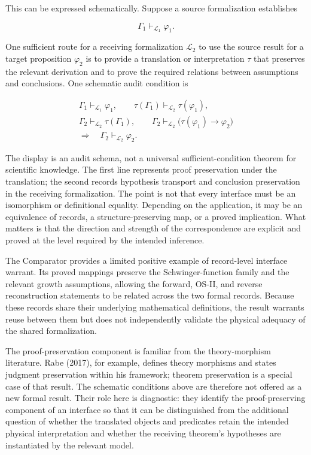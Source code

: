 \documentclass[pdflatex,sn-apa]{sn-jnl}
\begin{document}
This can be expressed schematically. Suppose a source formalization establishes

\[
\Gamma_1\vdash_{\mathcal L_1}\varphi_1.
\]

One sufficient route for a receiving formalization \(\mathcal L_2\) to use the source result for a target proposition \(\varphi_2\) is to provide a translation or interpretation \(\tau\) that preserves the relevant derivation and to prove the required relations between assumptions and conclusions. One schematic audit condition is

\[
\begin{gathered}
\Gamma_1\vdash_{\mathcal L_1}\varphi_1,\qquad
\tau(\Gamma_1)\vdash_{\mathcal L_2}\tau(\varphi_1),\\
\Gamma_2\vdash_{\mathcal L_2}\tau(\Gamma_1),\qquad
\Gamma_2\vdash_{\mathcal L_2}\bigl(\tau(\varphi_1)\rightarrow\varphi_2\bigr)
\\
\Longrightarrow\quad
\Gamma_2\vdash_{\mathcal L_2}\varphi_2.
\end{gathered}
\]

The display is an audit schema, not a universal sufficient-condition theorem for scientific knowledge. The first line represents proof preservation under the translation; the second records hypothesis transport and conclusion preservation in the receiving formalization. The point is not that every interface must be an isomorphism or definitional equality. Depending on the application, it may be an equivalence of records, a structure-preserving map, or a proved implication. What matters is that the direction and strength of the correspondence are explicit and proved at the level required by the intended inference.

The Comparator provides a limited positive example of record-level interface warrant. Its proved mappings preserve the Schwinger-function family and the relevant growth assumptions, allowing the forward, OS-II, and reverse reconstruction statements to be related across the two formal records. Because these records share their underlying mathematical definitions, the result warrants reuse between them but does not independently validate the physical adequacy of the shared formalization.

The proof-preservation component is familiar from the theory-morphism literature. Rabe (2017), for example, defines theory morphisms and states judgment preservation within his framework; theorem preservation is a special case of that result. The schematic conditions above are therefore not offered as a new formal result. Their role here is diagnostic: they identify the proof-preserving component of an interface so that it can be distinguished from the additional question of whether the translated objects and predicates retain the intended physical interpretation and whether the receiving theorem's hypotheses are instantiated by the relevant model.
\end{document}
